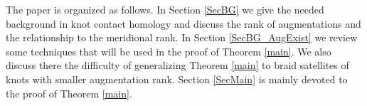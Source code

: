 \documentclass{amsart}[11pt,fullpage]
\def\C{{\mathbb C}}
\def\A{{\mathcal A}}
\newtheorem{cor}[thm]{Corollary}
\theoremstyle{definition}
\begin{document}


The paper is organized as follows. In Section \ref{SecBG} we give the needed background in knot contact homology and discuss the rank of augmentations and the relationship to the meridional rank. In Section \ref{SecBG_AugExist} we review some techniques that will be used in the proof of Theorem \ref{main}. We also discuss there the difficulty of generalizing Theorem \ref{main} to braid satellites of knots with smaller augmentation rank. Section \ref{SecMain} is mainly devoted to the proof of Theorem \ref{main}.













\end{document}
